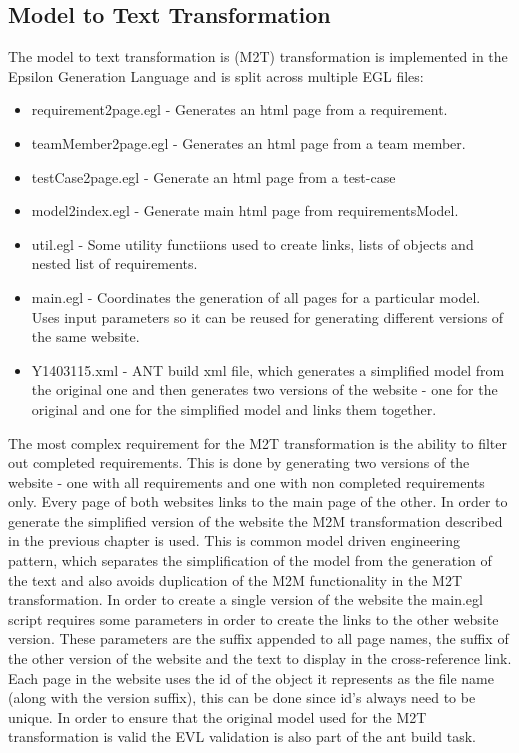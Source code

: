 \documentclass[11pt,a4paper]{article}
\begin{document}
	\subsection{Model to Text Transformation}
	The model to text transformation is (M2T) transformation is implemented in the Epsilon Generation Language \cite{egl} and is split across multiple EGL files:
	\begin{itemize}[noitemsep]
		
		\item requirement2page.egl - Generates an html page from a requirement.
		\item teamMember2page.egl  - Generates an html page from a team member.
		\item testCase2page.egl - Generate an html page from a test-case
		\item model2index.egl - Generate main html page from requirementsModel.
		\item util.egl - Some utility functiions used to create links, lists of objects and nested list of requirements.
		\item main.egl - Coordinates the generation of all pages for a particular model. Uses input parameters so it can be reused for generating different versions of the same website.
		\item Y1403115.xml - ANT \cite{ant} build xml file, which generates a simplified model from the original one and then generates two versions of the website - one for the original and one for the simplified model and links them together.
	\end{itemize}

	The most complex requirement for the M2T transformation is the ability to filter out completed requirements. This is done by generating two versions of the website - one with all requirements and one with non completed requirements only. Every page of both websites links to the main page of the other. In order to generate the simplified version of the website the M2M transformation described in the previous chapter is used. This is common model driven engineering pattern, which separates the simplification of the model from the generation of the text and also avoids duplication of the M2M functionality in the M2T transformation. In order to create a single version of the website the main.egl script requires some parameters in order to create the links to the other website version. These parameters are the suffix appended to all page names, the suffix of the other version of the website and the text to display in the cross-reference link. Each page in the website uses the id of the object it represents as the file name (along with the version suffix), this can be done since id's always need to be unique. In order to ensure that the original model used for the M2T transformation is valid the EVL validation is also part of the ant build task.
	
\end{document}
